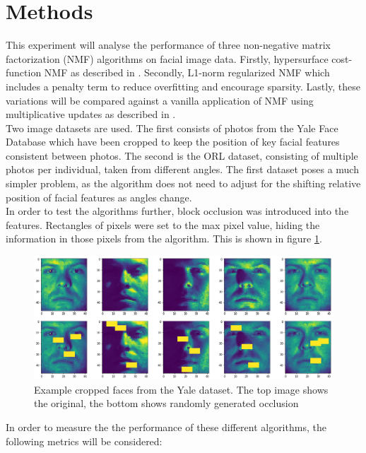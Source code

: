 \documentclass{article} %
\begin{document}
\section{Methods}

This experiment will analyse the performance of three non-negative matrix factorization (NMF) algorithms on facial image data. Firstly, hypersurface cost-function NMF as described in \cite{Hamza2006}. Secondly, L1-norm regularized NMF which includes a penalty term to reduce overfitting and encourage sparsity. Lastly, these variations will be compared against a vanilla application of NMF using multiplicative updates as described in \cite{NIPS2000_1861}.\\

Two image datasets are used. The first consists of photos from the Yale Face Database which have been cropped to keep the position of key facial features consistent between photos. The second is the ORL dataset, consisting of multiple photos per individual, taken from different angles. The first dataset poses a much simpler problem, as the algorithm does not need to adjust for the shifting relative position of facial features as angles change.\\

In order to test the algorithms further, block occlusion was introduced into the features. Rectangles of pixels were set to the max pixel value, hiding the information in those pixels from the algorithm. This is shown in figure \ref{fig:examplefaces}.\\

\begin{figure}[h]
  \includegraphics[width=\textwidth]{examplefaces}
  \caption{Example cropped faces from the Yale dataset. The top image shows the original, the bottom shows randomly generated occlusion}
  \label{fig:examplefaces}
\end{figure}

In order to measure the the performance of these different algorithms, the following metrics will be considered:\\
\end{document}
